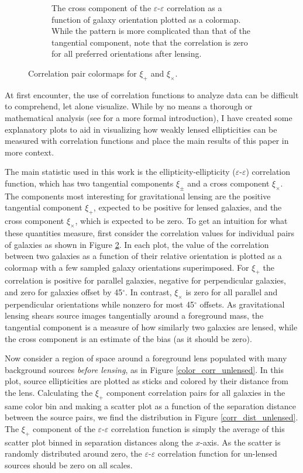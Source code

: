 \documentclass[%
 reprint,
 amsmath,amssymb,
 aps,nofootinbib
]{revtex4-1}
\begin{document}
\begin{figure}[!b]
\begin{subfigure}{0.425\textwidth}
        \captionsetup{justification=raggedright,singlelinecheck=false}
        \caption{The cross component of the $\varepsilon$-$\varepsilon$ correlation as a function of galaxy orientation plotted as a colormap. While the pattern is more complicated than that of the tangential component, note that the correlation is zero for all preferred orientations after lensing.}
        \label{xix_colormap}
    \end{subfigure}
    \caption{Correlation pair colormaps for $\xi_+$ and $\xi_\times$.}
    \label{corr_colormaps}
\end{figure}

At first encounter, the use of correlation functions to analyze data can be difficult to comprehend, let alone visualize. While by no means a thorough or mathematical analysis (see \cite{correlation_functions} for a more formal introduction), I have created some explanatory plots to aid in visualizing how weakly lensed ellipticities can be measured with correlation functions and place the main results of this paper in more context.

The main statistic used in this work is the ellipticity-ellipticity ($\varepsilon$-$\varepsilon$) correlation function, which has two tangential components $\xi_\pm$ and a cross component $\xi_\times$. The components most interesting for gravitational lensing are the positive tangential component $\xi_+$, expected to be positive for lensed galaxies, and the cross component $\xi_\times$, which is expected to be zero. To get an intuition for what these quantities measure, first consider the correlation values for individual pairs of galaxies as shown in Figure \ref{corr_colormaps}. In each plot, the value of the correlation between two galaxies as a function of their relative orientation is plotted as a colormap with a few sampled galaxy orientations superimposed. For $\xi_+$ the correlation is positive for parallel galaxies, negative for perpendicular galaxies, and zero for galaxies offset by 45$^\circ$. In contrast, $\xi_\times$ is zero for all parallel and perpendicular orientations while nonzero for most 45$^\circ$ offsets. As gravitational lensing shears source images tangentially around a foreground mass, the tangential component is a measure of how similarly two galaxies are lensed, while the cross component is an estimate of the bias (as it should be zero).

Now consider a region of space around a foreground lens populated with many background sources \textit{before lensing}, as in Figure \ref{color_corr_unlensed}. In this plot, source ellipticities are plotted as sticks and colored by their distance from the lens. Calculating the $\xi_+$ component correlation pairs for all galaxies in the same color bin and making a scatter plot as a function of the separation distance between the source pairs, we find the distribution in Figure \ref{corr_dist_unlensed}. The $\xi_+$ component of the $\varepsilon$-$\varepsilon$ correlation function is simply the average of this scatter plot binned in separation distances along the $x$-axis. As the scatter is randomly distributed around zero, the $\varepsilon$-$\varepsilon$ correlation function for un-lensed sources should be zero on all scales.
\end{document}
